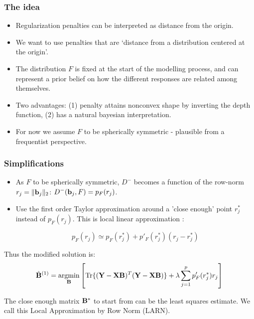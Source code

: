 \documentclass[handout,10pt]{beamer}
\DeclareMathOperator*{\Tr}{Tr}
\DeclareMathOperator*{\argmin}{argmin}
\begin{document}
\begin{frame}
\frametitle{The idea}

\begin{itemize}
\item Regularization penalties can be interpreted as distance from the origin.

\item We want to use penalties that are `distance from a distribution centered at the origin'.

\item The distribution $F$ is fixed at the start of the modelling process, and can represent a prior belief on how the different responses are related among themselves.

\item Two advantages: (1) penalty attains nonconvex shape by inverting the depth function, (2) has a natural bayesian interpretation.

\item For now we assume $F$ to be spherically symmetric - plausible from a frequentist perspective.
\end{itemize}
\end{frame}


\begin{frame}
\frametitle{Simplifications}
{
\begin{itemize}
\item As $F$ to be spherically symmetric, $D^-$ becomes a function of the row-norm $r_j = \|{\bf{b}}_j\|_2$: $D^-({\bf{b}}_j,F) = p_F(r_j)$.

\vspace{1em}
\item Use the first order Taylor approximation around a 'close enough' point $r_j^*$ instead of $p_F(r_j)$. This is local linear approximation \citep{ZouLi08}:

$$
p_F (r_j) \simeq p_F (r_j^*) + p'_F (r_j^*) ( r_j - r_j^*)
$$
\end{itemize}
}

\vspace{2em}
{
Thus the modified solution is:
$$
\hat\bfB^{(1)} = \argmin_\bfB \left[ \Tr \{ (\bfY - \bfX\bfB)^T ( \bfY - \bfX\bfB) \} + \lambda \sum_{j=1}^p p_F'(r_j^*)r_j \right]
$$

The close enough matrix ${\mathbf{B}}^*$ to start from can be the least squares estimate. We call this {\colbit Local Approximation by Row Norm} (LARN).
}
\end{frame}
\end{document}
